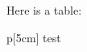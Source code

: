 \documentclass{article}
\begin{document}
Here is a table:

\begin{tabular}{p[5cm]}
test
\end{tabular}
\end{document}
